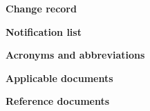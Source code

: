 \small
\cvsID
\normalsize

\pagebreak



\begin{center}
\Large
{\bf Change record\\ \vspace{1cm}}
\normalsize
\esochangerecord
\end{center}
\vspace{2cm}

\begin{center}
\Large
{\bf Notification list\\ \vspace{1cm}}
\normalsize
\esonotificationlist
\end{center}

\pagebreak

\begin{center}
\Large
{\bf Acronyms and abbreviations\\ \vspace{1cm}}
\normalsize
\esoabbreviations
\end{center}

\pagebreak

\begin{center}
\Large
{\bf Applicable documents\\ \vspace{1cm}}
\normalsize

\esoapplicabledocs
\end{center}
\vspace{2cm}

\begin{center}
\Large
{\bf Reference documents \\ \vspace{1cm}}
\normalsize

\esorefdocs
\end{center}

\pagebreak
\tableofcontents
\pagebreak
